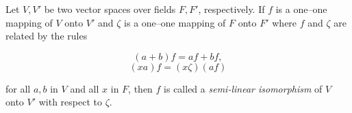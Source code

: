 Let $V, V'$ be two vector spaces over fields $F, F'$, respectively. If $f$ is a one--one mapping of $V$ onto $V'$ and $\zeta$ is a one--one mapping of $F$ onto $F'$ where $f$ and $\zeta$ are related by the rules

$$(a+b)f = af + bf,$$
$$(xa)f = (x\zeta)(af)$$

for all $a, b$ in $V$ and all $x$ in $F$, then $f$ is called a \textit{semi-linear isomorphism} of $V$ onto $V'$ with respect to $\zeta$.
